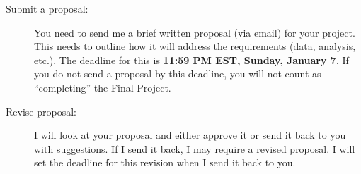 \documentclass{tufte-handout}
\begin{document}
\begin{description}
\item[{Submit a proposal:}]  You need to send me a brief written proposal (via email) for your project. This needs to outline how it will address the requirements (data, analysis, etc.). The deadline for this is \textbf{11:59 PM EST, Sunday, January 7}. If you do not send a proposal by this deadline, you will not count as ``completing'' the Final Project.
\item[{Revise proposal:}] I will look at your proposal and either approve it or send it back to you with suggestions. If I send it back, I may require a revised proposal. I will set the deadline for this revision when I send it back to you.
\end{description}
\newpage
\end{document}
